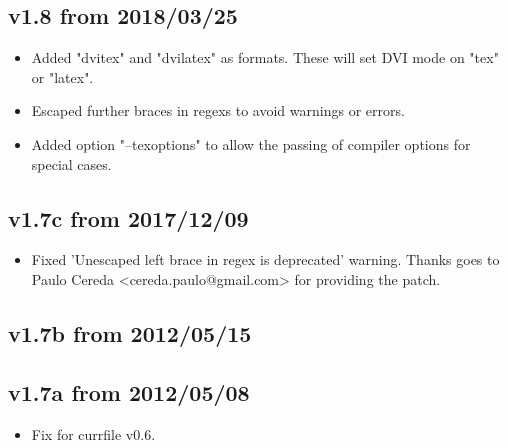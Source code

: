 \documentclass{ydoc}
\begin{document}
\subsection*{v1.8 from 2018/03/25}
\begin{itemize}
 \item Added "dvitex" and "dvilatex" as formats. These will set DVI mode on "tex" or "latex".
 \item Escaped further braces in regexs to avoid warnings or errors.
 \item Added option "--texoptions" to allow the passing of compiler options for special cases.
\end{itemize}

\subsection*{v1.7c from 2017/12/09}
\begin{itemize}
 \item Fixed 'Unescaped left brace in regex is deprecated' warning.
   Thanks goes to Paulo Cereda <cereda.paulo@gmail.com> for providing the patch.
\end{itemize}

\subsection*{v1.7b from 2012/05/15}

\subsection*{v1.7a from 2012/05/08}
\begin{itemize}
 \item Fix for currfile v0.6.
\end{itemize}
\end{document}
